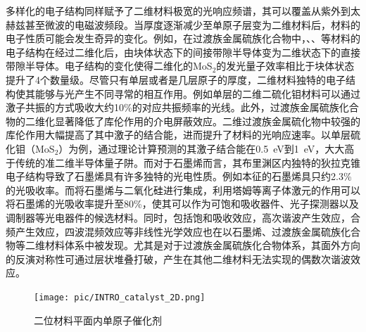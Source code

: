     多样化的电子结构同样赋予了二维材料极宽的光响应频谱，其可以覆盖从紫外到太赫兹甚至微波的电磁波频段。当厚度逐渐减少至单原子层变为二维材料后，材料的电子性质可能会发生奇异的变化。例如，在过渡族金属硫族化合物中，、、等材料的电子结构在经过二维化后，由块体状态下的间接带隙半导体变为二维状态下的直接带隙半导体。电子结构的变化使得二维化的MoS$_2$的发光量子效率相比于块体状态提升了4个数量级。尽管只有单层或者是几层原子的厚度，二维材料独特的电子结构使其能够与光产生不同寻常的相互作用。例如单层的二维二硫化钼材料可以通过激子共振的方式吸收大约10\%的对应共振频率的光线。此外，过渡族金属硫族化合物的二维化显著降低了库伦作用的介电屏蔽效应。二维过渡族金属硫化物中较强的库伦作用大幅提高了其中激子的结合能，进而提升了材料的光响应速率。以单层硫化钼（MoS$_2$）为例，通过理论计算预测的其激子结合能在\SI{0.5}{\electronvolt}到\SI{1}{\electronvolt}，大大高于传统的准二维半导体量子阱。而对于石墨烯而言，其布里渊区内独特的狄拉克锥电子结构导致了石墨烯具有许多独特的光电性质。例如本征的石墨烯具只约2.3\%的光吸收率。而将石墨烯与二氧化硅进行集成，利用塔姆等离子体激元的作用可以将石墨烯的光吸收率提升至80\%，使其可以作为可饱和吸收器件、光子探测器以及调制器等光电器件的候选材料。同时，包括饱和吸收效应，高次谐波产生效应，合频产生效应，四波混频效应等非线性光学效应也在以石墨烯、过渡族金属硫族化合物等二维材料体系中被发现。尤其是对于过渡族金属硫族化合物体系，其面外方向的反演对称性可通过层状堆叠打破，产生在其他二维材料无法实现的偶数次谐波效应。
    
    \begin{figure}[htb]
        \texttt{[image: pic/INTRO\_catalyst\_2D.png]}
        \caption{二位材料平面内单原子催化剂}
        \label{}
    \end{figure}


